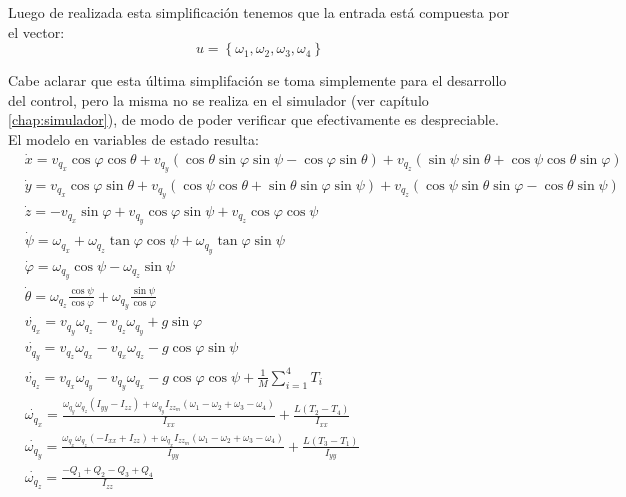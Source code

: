 \documentclass[main]{subfiles}
\begin{document}
Luego de realizada esta simplificaci\'on tenemos que la entrada est\'a compuesta por el vector:
\begin{equation}
\boxed{u=\left\lbrace\omega_1, \omega_2, \omega_3, \omega_4\right\rbrace}
\end{equation}

Cabe aclarar que esta \'ultima simplifaci\'on se toma simplemente para el desarrollo del control, pero la misma no se realiza en el simulador (ver cap\'itulo \ref{chap:simulador}), de modo de poder verificar que efectivamente es despreciable.\\

El modelo en variables de estado resulta:
\begin{equation}
\boxed{\begin{aligned}&\dot{x}=v_{q_x} \cos \varphi \cos \theta + v_{q_y} ( \cos \theta \sin \varphi \sin \psi-\cos \varphi \sin \theta ) + v_{q_z}(\sin \psi \sin \theta + \cos \psi \cos \theta \sin \varphi)\\
&\dot{y}=v_{q_x} \cos \varphi \sin \theta + v_{q_y} (\cos \psi \cos \theta + \sin \theta \sin \varphi \sin \psi) + v_{q_z}( \cos \psi \sin \theta \sin \varphi-\cos \theta \sin \psi )\\
&\dot{z}= -v_{q_x} \sin \varphi  + v_{q_y} \cos \varphi \sin \psi  + v_{q_z}\cos \varphi \cos \psi\\
&\dot{\psi}=\omega_{q_x} + \omega_{q_z}\tan\varphi \cos\psi + \omega_{q_y}\tan\varphi \sin\psi\\
&\dot{\varphi}=\omega_{q_y}\cos \psi - \omega_{q_z}\sin\psi\\
&\dot{\theta}=\omega_{q_z} \frac{\cos\psi}{\cos\varphi}  + \omega_{q_y}\frac{\sin\psi}{\cos\varphi}\\
&\dot{v_{q_x}}=v_{q_y} \omega_{q_z} - v_{q_z} \omega_{q_y}+g\sin\varphi\\
&\dot{v_{q_y}}=v_{q_z} \omega_{q_x} - v_{q_x} \omega_{q_z}-g\cos\varphi\sin\psi\\
&\dot{v_{q_z}}=v_{q_x} \omega_{q_y} - v_{q_y} \omega_{q_x}-g\cos\varphi\cos\psi+\frac{1}{M}\sum_{i=1}^4T_i\\
&\dot{\omega_{q_x}}=\frac{\omega_{q_y}\omega_{q_z}(I_{yy}-I_{zz})+\omega_{q_y}I_{zz_m}(\omega_1-\omega_2+\omega_3-\omega_4)}{I_{xx}}+\frac{L(T_2-T_4)}{I_{xx}}\\
&\dot{\omega_{q_y}}=\frac{\omega_{q_x}\omega_{q_z}(-I_{xx}+I_{zz})+\omega_{q_x}I_{zz_m}(\omega_1-\omega_2+\omega_3-\omega_4)}{{I_{yy}}}+\frac{L(T_3-T_1)}{I_{yy}}\\
&\dot{\omega_{q_z}}=\frac{-Q_1+Q_2-Q_3+Q_4}{I_{zz}}\\
\end{aligned}}
\label{eq:modelo}
\end{equation}
\end{document}
